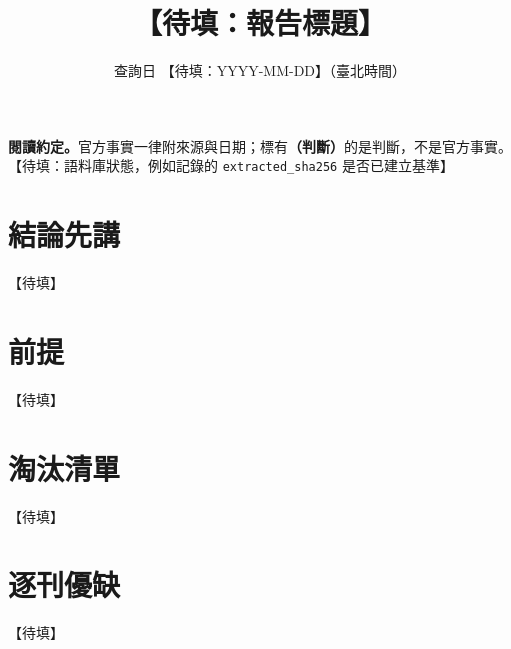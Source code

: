 \documentclass[11pt,a4paper]{article}
\title{【待填：報告標題】}
\author{}
\date{查詢日 【待填：YYYY-MM-DD】（臺北時間）}
\newcommand{\J}{\textcolor{judg}{\textbf{（判斷）}}}
\newcommand{\pro}{\textcolor{pro}{\textbf{優點}}}
\newcommand{\con}{\textcolor{con}{\textbf{缺點}}}
\begin{document}
\maketitle
\thispagestyle{fancy}

\noindent\textbf{閱讀約定。}官方事實一律附來源與日期；標有\J 的是判斷，不是官方事實。【待填：語料庫狀態，例如記錄的 \texttt{extracted\_sha256} 是否已建立基準】

\tableofcontents

\section{結論先講}
【待填】

\section{前提}
【待填】

\section{淘汰清單}
【待填】

\section{逐刊優缺}\label{sec:profcon}
【待填】
\end{document}
